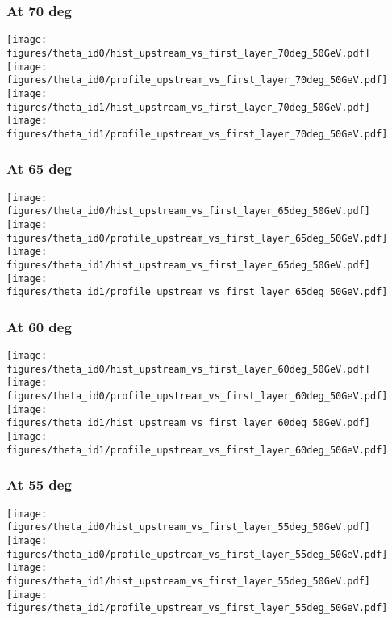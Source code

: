 \documentclass{beamer}
\begin{document}
\begin{frame}
  \frametitle{At 70 deg}
  \centering
  \texttt{[image: figures/theta\_id0/hist\_upstream\_vs\_first\_layer\_70deg\_50GeV.pdf]}
  \texttt{[image: figures/theta\_id0/profile\_upstream\_vs\_first\_layer\_70deg\_50GeV.pdf]} \\
  \texttt{[image: figures/theta\_id1/hist\_upstream\_vs\_first\_layer\_70deg\_50GeV.pdf]}
  \texttt{[image: figures/theta\_id1/profile\_upstream\_vs\_first\_layer\_70deg\_50GeV.pdf]}
\end{frame}

\begin{frame}
  \frametitle{At 65 deg}
  \centering
  \texttt{[image: figures/theta\_id0/hist\_upstream\_vs\_first\_layer\_65deg\_50GeV.pdf]}
  \texttt{[image: figures/theta\_id0/profile\_upstream\_vs\_first\_layer\_65deg\_50GeV.pdf]} \\
  \texttt{[image: figures/theta\_id1/hist\_upstream\_vs\_first\_layer\_65deg\_50GeV.pdf]}
  \texttt{[image: figures/theta\_id1/profile\_upstream\_vs\_first\_layer\_65deg\_50GeV.pdf]}
\end{frame}

\begin{frame}
  \frametitle{At 60 deg}
  \centering
  \texttt{[image: figures/theta\_id0/hist\_upstream\_vs\_first\_layer\_60deg\_50GeV.pdf]}
  \texttt{[image: figures/theta\_id0/profile\_upstream\_vs\_first\_layer\_60deg\_50GeV.pdf]} \\
  \texttt{[image: figures/theta\_id1/hist\_upstream\_vs\_first\_layer\_60deg\_50GeV.pdf]}
  \texttt{[image: figures/theta\_id1/profile\_upstream\_vs\_first\_layer\_60deg\_50GeV.pdf]}
\end{frame}

\begin{frame}
  \frametitle{At 55 deg}
  \centering
  \texttt{[image: figures/theta\_id0/hist\_upstream\_vs\_first\_layer\_55deg\_50GeV.pdf]}
  \texttt{[image: figures/theta\_id0/profile\_upstream\_vs\_first\_layer\_55deg\_50GeV.pdf]} \\
  \texttt{[image: figures/theta\_id1/hist\_upstream\_vs\_first\_layer\_55deg\_50GeV.pdf]}
  \texttt{[image: figures/theta\_id1/profile\_upstream\_vs\_first\_layer\_55deg\_50GeV.pdf]}
\end{frame}
\end{document}

